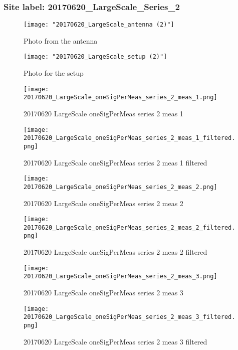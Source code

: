 \subsubsection{Site label: 20170620\_LargeScale\_Series\_2}
\begin{figure}[ht] \caption{Photo from the antenna}
\texttt{[image: "20170620\_LargeScale\_antenna (2)"]}\centering\end{figure}
\begin{figure}[ht] \caption{Photo for the setup}
\texttt{[image: "20170620\_LargeScale\_setup (2)"]}\centering\end{figure}
\begin{figure}[ht] \caption{20170620 LargeScale oneSigPerMeas series 2 meas 1}
\texttt{[image: 20170620\_LargeScale\_oneSigPerMeas\_series\_2\_meas\_1.png]}\centering\end{figure}
\begin{figure}[ht] \caption{20170620 LargeScale oneSigPerMeas series 2 meas 1 filtered}
\texttt{[image: 20170620\_LargeScale\_oneSigPerMeas\_series\_2\_meas\_1\_filtered.png]}\centering\end{figure}
\begin{figure}[ht] \caption{20170620 LargeScale oneSigPerMeas series 2 meas 2}
\texttt{[image: 20170620\_LargeScale\_oneSigPerMeas\_series\_2\_meas\_2.png]}\centering\end{figure}
\begin{figure}[ht] \caption{20170620 LargeScale oneSigPerMeas series 2 meas 2 filtered}
\texttt{[image: 20170620\_LargeScale\_oneSigPerMeas\_series\_2\_meas\_2\_filtered.png]}\centering\end{figure}
\begin{figure}[ht] \caption{20170620 LargeScale oneSigPerMeas series 2 meas 3}
\texttt{[image: 20170620\_LargeScale\_oneSigPerMeas\_series\_2\_meas\_3.png]}\centering\end{figure}
\begin{figure}[ht] \caption{20170620 LargeScale oneSigPerMeas series 2 meas 3 filtered}
\texttt{[image: 20170620\_LargeScale\_oneSigPerMeas\_series\_2\_meas\_3\_filtered.png]}\centering\end{figure}
\clearpage
